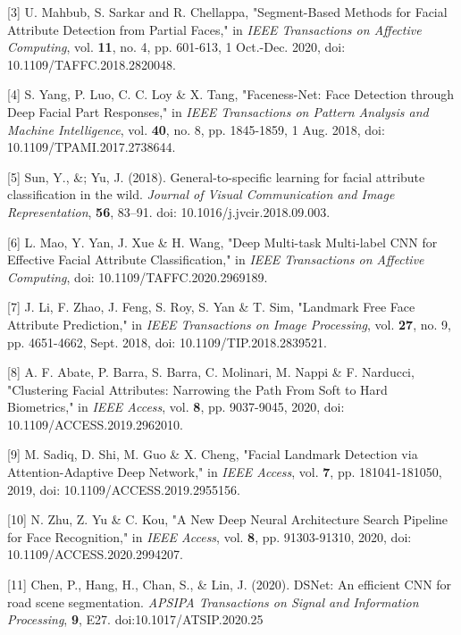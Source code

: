\documentclass{article}
\begin{document}
[3] U. Mahbub, S. Sarkar and R. Chellappa, "Segment-Based Methods for Facial Attribute Detection from Partial Faces," in {\it IEEE Transactions on Affective Computing}, vol. {\bf11}, no. 4, pp. 601-613, 1 Oct.-Dec. 2020, doi: 10.1109/TAFFC.2018.2820048.

[4] S. Yang, P. Luo, C. C. Loy \& X. Tang, "Faceness-Net: Face Detection through Deep Facial Part Responses," in {\it IEEE Transactions on Pattern Analysis and Machine Intelligence}, vol. {\bf40}, no. 8, pp. 1845-1859, 1 Aug. 2018, doi: 10.1109/TPAMI.2017.2738644.

[5] Sun, Y., \&; Yu, J. (2018). General-to-specific learning for facial attribute classification in the wild. {\it Journal of Visual Communication and Image Representation}, {\bf56}, 83–91. doi: 10.1016/j.jvcir.2018.09.003. 

[6] L. Mao, Y. Yan, J. Xue \& H. Wang, "Deep Multi-task Multi-label CNN for Effective Facial Attribute Classification," in {\it IEEE Transactions on Affective Computing}, doi: 10.1109/TAFFC.2020.2969189.

[7] J. Li, F. Zhao, J. Feng, S. Roy, S. Yan \& T. Sim, "Landmark Free Face Attribute Prediction," in {\it IEEE Transactions on Image Processing}, vol. {\bf27}, no. 9, pp. 4651-4662, Sept. 2018, doi: 10.1109/TIP.2018.2839521.

[8] A. F. Abate, P. Barra, S. Barra, C. Molinari, M. Nappi \& F. Narducci, "Clustering Facial Attributes: Narrowing the Path From Soft to Hard Biometrics," in {\it IEEE Access}, vol. {\bf8}, pp. 9037-9045, 2020, doi: 10.1109/ACCESS.2019.2962010.

[9] M. Sadiq, D. Shi, M. Guo \& X. Cheng, "Facial Landmark Detection via Attention-Adaptive Deep Network," in {\it IEEE Access}, vol. {\bf7}, pp. 181041-181050, 2019, doi: 10.1109/ACCESS.2019.2955156.

[10] N. Zhu, Z. Yu \& C. Kou, "A New Deep Neural Architecture Search Pipeline for Face Recognition," in {\it IEEE Access}, vol. {\bf8}, pp. 91303-91310, 2020, doi: 10.1109/ACCESS.2020.2994207.

[11] Chen, P., Hang, H., Chan, S., \& Lin, J. (2020). DSNet: An efficient CNN for road scene segmentation. {\it APSIPA Transactions on Signal and Information Processing}, {\bf9}, E27. doi:10.1017/ATSIP.2020.25
\end{document}
